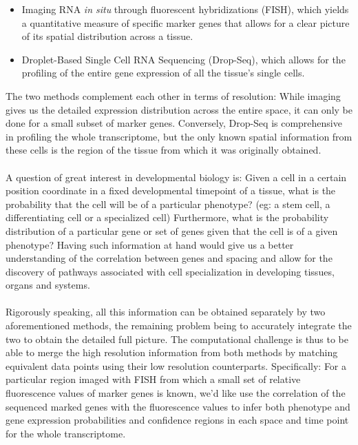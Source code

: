 \begin{itemize}

 \item Imaging RNA \emph{in situ} through fluorescent hybridizations (FISH), which yields a quantitative measure of specific marker genes that allows for a clear picture of its spatial distribution across a tissue. \\
 \item Droplet-Based Single Cell RNA Sequencing (Drop-Seq), which allows for the profiling of the entire gene expression of all the tissue's single cells.\\
\end{itemize}
 The two methods complement each other in terms of resolution: While imaging gives us the detailed expression distribution across the entire space, it can only be done for a small subset of marker genes. Conversely,  Drop-Seq is comprehensive in profiling the whole transcriptome, but the only known spatial information from these cells is the region of the tissue from which it was originally obtained. \\
 \\
 A question of great interest in developmental biology is: Given a cell in a certain position coordinate in a fixed developmental timepoint of a tissue, what is the probability that the cell will be of a particular phenotype? (eg: a stem cell, a differentiating cell or a specialized cell) Furthermore, what is the probability distribution of a particular gene or set of genes given that the cell is of a given phenotype? Having such information at hand would give us a better understanding of the correlation between genes and spacing and allow for the discovery of pathways associated with cell specialization in developing tissues, organs and systems. \\
 \\
 Rigorously speaking, all this information can be obtained separately by two aforementioned methods, the remaining problem being to accurately integrate the two to obtain the detailed full picture. The computational challenge is thus to be able to merge the high resolution information from both methods by matching equivalent data points using their low resolution counterparts. Specifically: For a particular region imaged with FISH from which a small set of relative fluorescence values of marker genes is known, we'd like use the correlation of the sequenced marked genes with the fluorescence values to infer both phenotype and gene expression probabilities and confidence regions in each space and time point for the whole transcriptome. 

%



